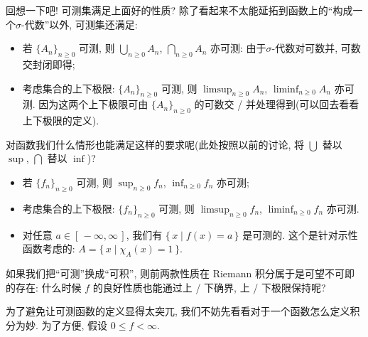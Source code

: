 回想一下吧! 可测集满足上面好的性质? 除了看起来不太能延拓到函数上的``构成一个\;$\sigma $-代数''以外, 可测集还满足:
\begin{itemize}
    \item 若 $\{A_n\}_{n\geqslant 0}$ 可测, 则 $\bigcup_{n\geqslant 0}A_n$, $\bigcap_{n\geqslant 0}A_n$ 亦可测: 由于\;$\sigma $-代数对可数并, 可数交封闭即得;
    \item 考虑集合的上下极限: $\{A_n\}_{n\geqslant 0}$ 可测, 则 $\limsup_{n\geqslant 0}A_n$, $\liminf_{n\geqslant 0}A_n$ 亦可测. 因为这两个上下极限可由 $\{A_n\}_{n\geqslant 0}$ 的可数交 / 并处理得到(可以回去看看上下极限的定义).
\end{itemize}
对函数我们什么情形也能满足这样的要求呢(此处按照以前的讨论, 将 $\bigcup$ 替以 $\sup$, $\bigcap$ 替以 $\inf$)?
\begin{itemize}
    \item 若 $\{f_n\}_{n\geqslant 0}$ 可测, 则 $\sup_{n\geqslant 0}f_n$, $\inf_{n\geqslant 0}f_n$ 亦可测;
    \item 考虑集合的上下极限: $\{f_n\}_{n\geqslant 0}$ 可测, 则 $\limsup_{n\geqslant 0}f_n$, $\liminf_{n\geqslant 0}f_n$ 亦可测.
    \item 对任意 $a\in[\,-\infty,\infty\,]$, 我们有 $\{\,x\mid f(x)=a\,\}$ 是可测的. 这个是针对示性函数考虑的: $A = \{\,x\mid \chi_A(x)=1\,\}$.
\end{itemize}
如果我们把``可测''换成``可积'', 则前两款性质在 Riemann 积分属于是可望不可即的存在: 什么时候 $f$ 的良好性质也能通过上 / 下确界, 上 / 下极限保持呢\enote?

为了避免让可测函数的定义显得太突兀, 我们不妨先看看对于一个函数怎么定义积分为妙. 为了方便, 假设 $0\leqslant f<\infty$.

